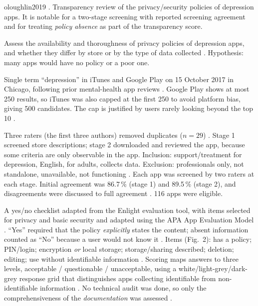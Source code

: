 \begin{papercard}{oloughlin2019}
   . Transparency review of the privacy/security policies of depression apps. It is notable for a two-stage screening with reported screening agreement and for treating \emph{policy absence} as part of the transparency score.

 Assess the availability and thoroughness of privacy policies of depression apps, and whether they differ by store or by the type of data collected . Hypothesis: many apps would have no policy or a poor one.

 Single term ``depression'' in iTunes and Google Play on 15 October 2017 in Chicago, following prior mental-health app reviews . Google Play shows at most 250 results, so iTunes was also capped at the first 250 to avoid platform bias, giving 500 candidates. The cap is justified by users rarely looking beyond the top 10 .

 Three raters (the first three authors) removed duplicates ($n=29$) . Stage 1 screened store descriptions; stage 2 downloaded and reviewed the app, because some criteria are only observable in the app. Inclusion: support/treatment for depression, English, for adults, collects data. Exclusion: professionals only, not standalone, unavailable, not functioning . Each app was screened by two raters at each stage. Initial agreement was 86.7\,\% (stage 1) and 89.5\,\% (stage 2), and disagreements were discussed to full agreement . 116 apps were eligible.

 A yes/no checklist adapted from the Enlight evaluation tool, with items selected for privacy and basic security and adapted using the APA App Evaluation Model . ``Yes'' required that the policy \emph{explicitly} states the content; absent information counted as ``No'' because a user would not know it . Items (Fig.~2): has a policy; PIN/login; encryption \emph{or} local storage; storage/sharing described; deletion; editing; use without identifiable information . Scoring maps answers to three levels, acceptable / questionable / unacceptable, using a white/light-grey/dark-grey response grid that distinguishes apps collecting identifiable from non-identifiable information . No technical audit was done, so only the comprehensiveness of the \emph{documentation} was assessed .


\end{papercard}
